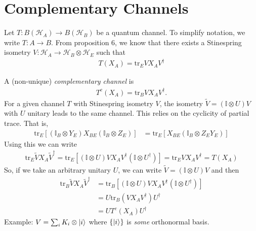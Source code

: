 \documentclass[../../note.tex]{subfiles}
\begin{document}
\section{Complementary Channels}
Let $T:B(\mathcal{H}_A)\rightarrow B(\mathcal{H}_B)$ be a quantum channel. To simplify notation, we write $T:A\rightarrow B$. From proposition 6, we know that there exists a Stinespring isometry $V:\mathcal{H}_A \rightarrow \mathcal{H}_B \otimes \mathcal{H}_E$ such that 
\begin{align}
    T(X_A) = \text{tr}_E VX_A V^{\dagger}
\end{align}

 A (non-unique) \textit{complementary channel} is 
\begin{align}
    T^c (X_A) = \text{tr}_B VX_A V^{\dagger}.
\end{align}
For a given channel $T$ with Stinespring isometry $V$, the isometry $\tilde{V}=(\mathbb{I} \otimes U)V$ with $U$ unitary leads to the same channel. This relies on the cyclicity of partial trace. That is, 
\begin{align}
    \text{tr}_E \left[(\mathbb{I}_B \otimes Y_E) X_{BE} (\mathbb{I}_B \otimes Z_E)\right] &= \text{tr}_E \left[X_{BE}(\mathbb{I}_B\otimes Z_E Y_E)\right]
\end{align}
Using this we can write
\begin{align}
    \text{tr}_E \tilde{V} X_A \tilde{V}^{\dagger} = \text{tr}_E \left[(\mathbb{I} \otimes U) VX_A V^{\dagger}(\mathbb{I}\otimes U^{\dagger})\right] = \text{tr}_E V X_A V^{\dagger} = T(X_A)
\end{align}
So, if we take an arbitrary unitary $U$, we can write $\tilde{V} =(\mathbb{I} \otimes U)V$ and then
\begin{align}
    \text{tr}_B \tilde{V}X_A \tilde{V}^{\dagger} &= \text{tr}_B \left[(\mathbb{I}\otimes U ) VX_A V^{\dagger} (\mathbb{I}\otimes U^{\dagger})\right]\\
    &= U \text{tr}_B (V X_A V^{\dagger})U^{\dagger} \\
    &= U T^c (X_A) U^{\dagger}
\end{align}
Example: $V=\sum_i K_i \otimes \ket{i}$ where $\{\ket{i}\}$ is \textit{some} orthonormal basis. 
\end{document}
